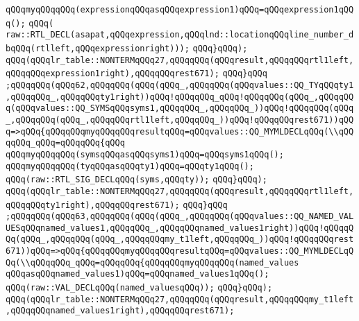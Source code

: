 \verb|qQQqmyqQQqqQQq(expressionqQQqasqQQqexpression1)qQQq=qQQqexpression1qQQq();|\newline
\verb|qQQq(|\newline
\verb|raw::RTL_DECL(asapat,qQQqexpression,qQQqlnd::locationqQQqline_number_dbqQQq(rtlleft,qQQqexpressionright)));|\newline
\verb|qQQq}qQQq);|\newline
\verb|qQQq(qQQqlr_table::NONTERMqQQq27,qQQqqQQq(qQQqresult,qQQqqQQqrtl1left,qQQqqQQqexpression1right),qQQqqQQqrest671);|\newline
\verb|qQQq}qQQq|\newline
\verb|;qQQqqQQq(qQQq62,qQQqqQQq(qQQq(qQQq_,qQQqqQQq(qQQqvalues::QQ_TYqQQqty1,qQQqqQQq_,qQQqqQQqty1right))qQQq!qQQqqQQq_qQQq!qQQqqQQq(qQQq_,qQQqqQQq(qQQqvalues::QQ_SYMSqQQqsyms1,qQQqqQQq_,qQQqqQQq_))qQQq!qQQqqQQq(qQQq_,qQQqqQQq(qQQq_,qQQqqQQqrtl1left,qQQqqQQq_))qQQq!qQQqqQQqrest671))qQQq=>qQQq{qQQqqQQqmyqQQqqQQqresultqQQq=qQQqvalues::QQ_MYMLDECLqQQq(\\qQQqqQQq_qQQq=qQQqqQQq{qQQq|\newline
\verb|qQQqmyqQQqqQQq(symsqQQqasqQQqsyms1)qQQq=qQQqsyms1qQQq();|\newline
\verb|qQQqmyqQQqqQQq(tyqQQqasqQQqty1)qQQq=qQQqty1qQQq();|\newline
\verb|qQQq(raw::RTL_SIG_DECLqQQq(syms,qQQqty));|\newline
\verb|qQQq}qQQq);|\newline
\verb|qQQq(qQQqlr_table::NONTERMqQQq27,qQQqqQQq(qQQqresult,qQQqqQQqrtl1left,qQQqqQQqty1right),qQQqqQQqrest671);|\newline
\verb|qQQq}qQQq|\newline
\verb|;qQQqqQQq(qQQq63,qQQqqQQq(qQQq(qQQq_,qQQqqQQq(qQQqvalues::QQ_NAMED_VALUESqQQqnamed_values1,qQQqqQQq_,qQQqqQQqnamed_values1right))qQQq!qQQqqQQq(qQQq_,qQQqqQQq(qQQq_,qQQqqQQqmy_t1left,qQQqqQQq_))qQQq!qQQqqQQqrest671))qQQq=>qQQq{qQQqqQQqmyqQQqqQQqresultqQQq=qQQqvalues::QQ_MYMLDECLqQQq(\\qQQqqQQq_qQQq=qQQqqQQq{qQQqqQQqmyqQQqqQQq(named_values|\newline
\verb|qQQqasqQQqnamed_values1)qQQq=qQQqnamed_values1qQQq();|\newline
\verb|qQQq(raw::VAL_DECLqQQq(named_valuesqQQq));|\newline
\verb|qQQq}qQQq);|\newline
\verb|qQQq(qQQqlr_table::NONTERMqQQq27,qQQqqQQq(qQQqresult,qQQqqQQqmy_t1left,qQQqqQQqnamed_values1right),qQQqqQQqrest671);|\newline
